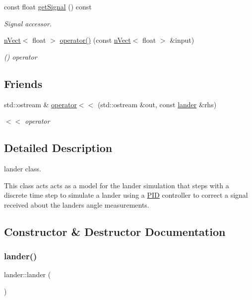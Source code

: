\begin{DoxyCompactItemize}
const float \hyperlink{classlander_a47e887be0b3b8bb2f48f6913b2917ecf}{get\+Signal} () const
\begin{DoxyCompactList}\small\item\em Signal accessor. \end{DoxyCompactList}\item 
\hyperlink{classnVect}{n\+Vect}$<$ float $>$ \hyperlink{classlander_a2fe992a7fb65bbcc59c9ce929c9a6069}{operator()} (const \hyperlink{classnVect}{n\+Vect}$<$ float $>$ \&input)
\begin{DoxyCompactList}\small\item\em () operator \end{DoxyCompactList}\end{DoxyCompactItemize}
\subsection*{Friends}
\begin{DoxyCompactItemize}
\item 
std\+::ostream \& \hyperlink{classlander_ab6f8c74d299fffd0364da0d38b9a8509}{operator$<$$<$} (std\+::ostream \&out, const \hyperlink{classlander}{lander} \&rhs)
\begin{DoxyCompactList}\small\item\em $<$$<$ operator \end{DoxyCompactList}\end{DoxyCompactItemize}


\subsection{Detailed Description}
lander class. 

This class acts acts as a model for the lander simulation that steps with a discrete time step to simulate a lander using a \hyperlink{classPID}{P\+ID} controller to correct a signal received about the landers angle measurements. 

\subsection{Constructor \& Destructor Documentation}
\mbox{\label{classlander_ad90447438348cd18fc11a1e5c535bcc7}} 
\subsubsection{\texorpdfstring{lander()}{lander()}\hspace{0.1cm}{\footnotesize\ttfamily [1/3]}}
{\footnotesize\ttfamily lander\+::lander (\begin{DoxyParamCaption}{ }\end{DoxyParamCaption})}



